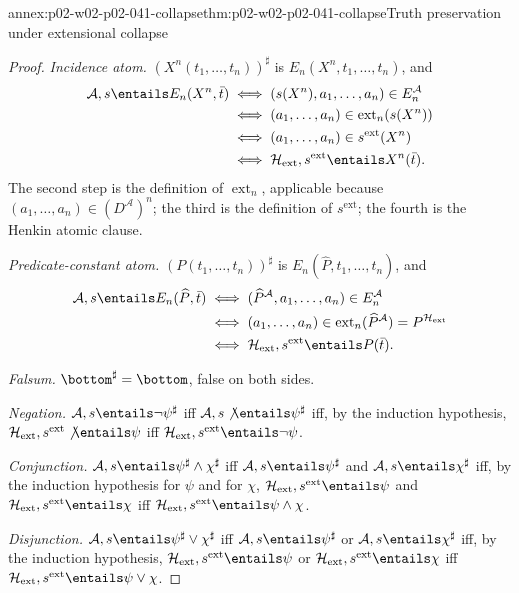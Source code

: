 \begin{annexitem}{annex:p02-w02-p02-041-collapse}{thm:p02-w02-p02-041-collapse}{Truth preservation under extensional collapse}
\begin{proof}
\emph{Incidence atom.}  \((X^n(t_1,\ldots,t_n))^\sharp\) is
\(E_n(X^n,t_1,\ldots,t_n)\), and
\[
\begin{aligned}
 \mathcal A,s\entails E_n(X^n,\bar t)
 &\iff(s(X^n),a_1,\ldots,a_n)\in E_n^{\mathcal A}\\
 &\iff(a_1,\ldots,a_n)\in\operatorname{ext}_n(s(X^n))\\
 &\iff(a_1,\ldots,a_n)\in s^{\mathrm{ext}}(X^n)\\
 &\iff\mathcal H_{\mathrm{ext}},s^{\mathrm{ext}}\entails X^n(\bar t).
\end{aligned}
\]
The second step is the definition of \(\operatorname{ext}_n\), applicable
because \((a_1,\ldots,a_n)\in(D^{\mathcal A})^n\); the third is the
definition of \(s^{\mathrm{ext}}\); the fourth is the Henkin atomic clause.

\emph{Predicate-constant atom.}  \((P(t_1,\ldots,t_n))^\sharp\) is
\(E_n(\widehat P,t_1,\ldots,t_n)\), and
\[
\begin{aligned}
 \mathcal A,s\entails E_n(\widehat P,\bar t)
 &\iff(\widehat P^{\mathcal A},a_1,\ldots,a_n)\in E_n^{\mathcal A}\\
 &\iff(a_1,\ldots,a_n)\in\operatorname{ext}_n(\widehat P^{\mathcal A})
   =P^{\mathcal H_{\mathrm{ext}}}\\
 &\iff\mathcal H_{\mathrm{ext}},s^{\mathrm{ext}}\entails P(\bar t).
\end{aligned}
\]

\emph{Falsum.}  \(\bottom^\sharp=\bottom\), false on both sides.

\emph{Negation.}  \(\mathcal A,s\entails\neg\psi^\sharp\) iff
\(\mathcal A,s\not\entails\psi^\sharp\) iff, by the induction hypothesis,
\(\mathcal H_{\mathrm{ext}},s^{\mathrm{ext}}\not\entails\psi\) iff
\(\mathcal H_{\mathrm{ext}},s^{\mathrm{ext}}\entails\neg\psi\).

\emph{Conjunction.}  \(\mathcal A,s\entails\psi^\sharp\land\chi^\sharp\) iff
\(\mathcal A,s\entails\psi^\sharp\) and \(\mathcal A,s\entails\chi^\sharp\)
iff, by the induction hypothesis for \(\psi\) and for \(\chi\),
\(\mathcal H_{\mathrm{ext}},s^{\mathrm{ext}}\entails\psi\) and
\(\mathcal H_{\mathrm{ext}},s^{\mathrm{ext}}\entails\chi\) iff
\(\mathcal H_{\mathrm{ext}},s^{\mathrm{ext}}\entails\psi\land\chi\).

\emph{Disjunction.}  \(\mathcal A,s\entails\psi^\sharp\lor\chi^\sharp\) iff
\(\mathcal A,s\entails\psi^\sharp\) or \(\mathcal A,s\entails\chi^\sharp\)
iff, by the induction hypothesis,
\(\mathcal H_{\mathrm{ext}},s^{\mathrm{ext}}\entails\psi\) or
\(\mathcal H_{\mathrm{ext}},s^{\mathrm{ext}}\entails\chi\) iff
\(\mathcal H_{\mathrm{ext}},s^{\mathrm{ext}}\entails\psi\lor\chi\).


\end{proof}
\end{annexitem}
